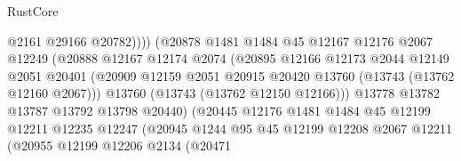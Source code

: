 \begin{lexlean}{RustCore}
\begin{coremodule}
                                        @2161
                                        @29166
                                        @20782))))
                                (@20878
                                  @1481
                                  @1484
                                  @45
                                  @12167
                                  @12176
                                  @2067
                                  @12249
                                  (@20888
                                    @12167
                                    @12174
                                    @2074
                                    (@20895
                                      @12166
                                      @12173
                                      @2044
                                      @12149
                                      @2051
                                      @20401
                                      (@20909
                                        @12159
                                        @2051
                                        @20915
                                        @20420
                                        @13760
                                        (@13743 (@13762 @12160 @2067)))
                                      @13760
                                      (@13743 (@13762 @12150 @12166)))
                                    @13778
                                    @13782
                                    @13787
                                    @13792
                                    @13798
                                    @20440)
                                  (@20445
                                    @12176
                                    @1481
                                    @1484
                                    @45
                                    @12199
                                    @12211
                                    @12235
                                    @12247
                                    (@20945
                                      @1244
                                      @95
                                      @45
                                      @12199
                                      @12208
                                      @2067
                                      @12211
                                      (@20955
                                        @12199
                                        @12206
                                        @2134
                                        (@20471

\end{coremodule}
\end{lexlean}
